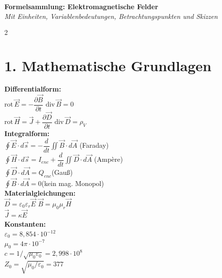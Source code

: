 \documentclass[a4paper, 7.5pt]{extarticle}
\begin{document}
\begin{center}
    \textbf{\Large Formelsammlung: Elektromagnetische Felder}\\[1pt]
    \textit{Mit Einheiten, Variablenbedeutungen, Betrachtungspunkten und Skizzen}
\end{center}

\begin{multicols*}{2}

\section*{1. Mathematische Grundlagen}

\begin{tcolorbox}[title={Maxwell-Gleichungen -- Differentiell \& Integral}]
\textbf{Differentialform:}\\
$\text{rot}\,\vec{E} = -\dfrac{\partial \vec{B}}{\partial t}$\quad
$\text{div}\,\vec{B} = 0$\\[2pt]
$\text{rot}\,\vec{H} = \vec{J} + \dfrac{\partial \vec{D}}{\partial t}$\quad
$\text{div}\,\vec{D} = \rho_V$\\[3pt]
\textbf{Integralform:}\\
$\oint \vec{E}\cdot d\vec{s} = -\dfrac{d}{dt}\iint \vec{B}\cdot d\vec{A}$ \quad (Faraday)\\[2pt]
$\oint \vec{H}\cdot d\vec{s} = I_{enc} + \dfrac{d}{dt}\iint \vec{D}\cdot d\vec{A}$ \quad (Ampère)\\[2pt]
$\oint \vec{D}\cdot d\vec{A} = Q_{enc}$\quad (Gauß)\\[2pt]
$\oint \vec{B}\cdot d\vec{A} = 0$\quad (kein mag. Monopol)\\[3pt]
\textbf{Materialgleichungen:}\\
$\vec{D} = \varepsilon_0\varepsilon_r\vec{E}$ \;\text{\textcolor{boxtitle}{[\(As/m^2\)]}}\quad
$\vec{B} = \mu_0\mu_r\vec{H}$ \;\text{\textcolor{boxtitle}{[\(T = Vs/m^2\)]}}\\
$\vec{J} = \kappa\vec{E}$ \;\text{\textcolor{boxtitle}{[\(A/m^2\)]}}\\[3pt]
\textbf{Konstanten:}\\
$\varepsilon_0 = 8{,}854\cdot10^{-12}$ \;\text{\textcolor{boxtitle}{[\(As/(Vm) = F/m\)]}}\\
$\mu_0 = 4\pi\cdot10^{-7}$ \;\text{\textcolor{boxtitle}{[\(Vs/(Am) = H/m\)]}}\\
$c = 1/\sqrt{\mu_0\varepsilon_0} = 2{,}998\cdot10^8$ \;\text{\textcolor{boxtitle}{[\(m/s\)]}}\\
$Z_0 = \sqrt{\mu_0/\varepsilon_0} = 377$ \;\text{\textcolor{boxtitle}{[\(\Omega\)]}}
\end{tcolorbox}


\end{multicols*}
\end{document}
